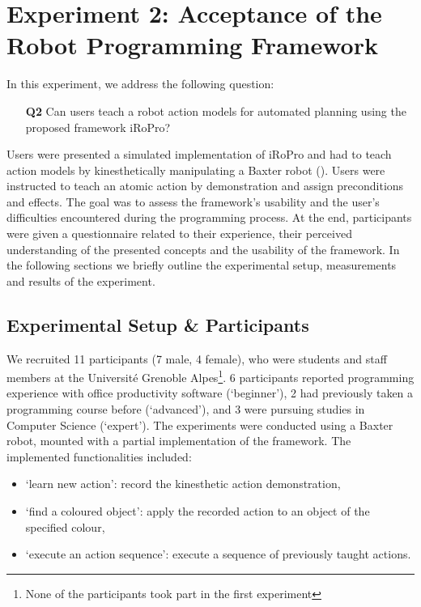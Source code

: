 \section{Experiment 2: Acceptance of the Robot Programming Framework}
\label{sec:Exp2}

In this experiment, we address the following question:

\begin{enumerate}
  \item[\textbf{Q2}] Can users teach a robot action models for automated planning using the proposed framework iRoPro?
\end{enumerate}
\begin{sloppypar}
Users were presented a simulated implementation of iRoPro and had to teach action models by kinesthetically manipulating a Baxter robot (). 
Users were instructed to teach an atomic action by demonstration and assign preconditions and effects.
The goal was to assess the framework's usability and the user's difficulties encountered during the programming process.
At the end, participants were given a questionnaire related to their experience, their perceived understanding of the presented concepts and the usability of the framework.
In the following sections we briefly outline the experimental setup, measurements and results of the experiment.
\end{sloppypar}

\subsection{Experimental Setup \& Participants}
We recruited 11 participants (7 male, 4 female), who were students and staff members at the Universit\'{e} Grenoble Alpes\footnote{None of the participants took part in the first experiment}.
6 participants reported programming experience with office productivity software (`beginner'), 2 had previously taken a programming course before (`advanced'), and 3 were pursuing studies in Computer Science (`expert').
The experiments were conducted using a Baxter robot, mounted with a partial implementation of the framework.
The implemented functionalities included:
\begin{itemize}
	\item `learn new action': record the kinesthetic action demonstration,
	\item `find a coloured object': apply the recorded action to an object of the specified colour,
	\item `execute an action sequence': execute a sequence of previously taught actions.
\end{itemize}

